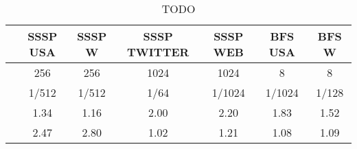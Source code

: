 \begin{table}[h]
\centring
\begin{tabular}{ |c|c|c|c|c|c|c| }
\hline
 & \large{\textbf{SSSP USA}} & \large{\textbf{SSSP W}} & \large{\textbf{SSSP TWITTER}} & \large{\textbf{SSSP WEB}} & \large{\textbf{BFS USA}} & \large{\textbf{BFS W}} \\
\hline
\insbatch{} & 256 & 256 & 1024 & 1024 & 8 & 8 \\
\hline
\delprob{} & 1/512 & 1/512 & 1/64 & 1/1024 & 1/1024 & 1/128 \\
\hline
\speed{} & 1.34 & 1.16 & 2.00 & 2.20 & 1.83 & 1.52 \\
\hline
\workinc{} & 2.47 & 2.80 & 1.02 & 1.21 & 1.08 & 1.09 \\
\hline
\end{tabular}
\vspace{0.3em}
\caption{TODO }
\label{table:todo}
\end{table}

